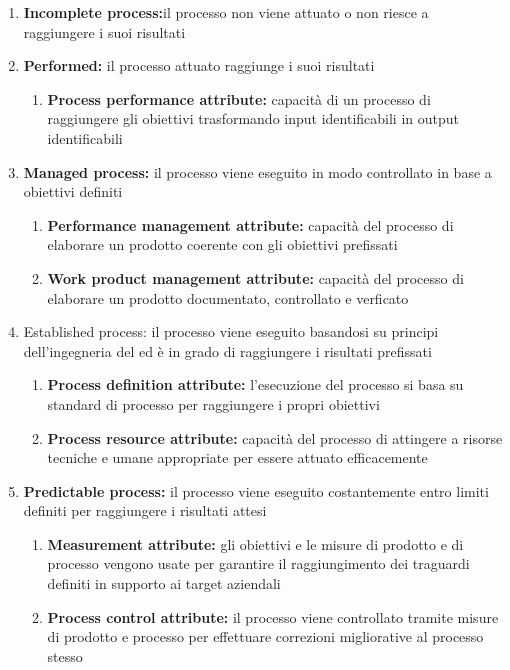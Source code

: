 \documentclass[12pt,a4paper]{article}
\begin{document}
\begin{enumerate}
	\item\textbf{Incomplete process:}il processo non viene attuato o non riesce a raggiungere i	suoi risultati
	
	\item\textbf{Performed:} il processo attuato raggiunge i suoi risultati
	\begin{enumerate}
		\item\textbf{Process performance attribute:} capacità di un processo di raggiungere gli obiettivi trasformando input identificabili in output identificabili
	\end{enumerate}
	
	\item \textbf{Managed process:} il processo viene eseguito in modo controllato in base a obiettivi definiti
	\begin{enumerate}
		\item\textbf{Performance management attribute:} capacità del processo di elaborare un prodotto coerente con gli obiettivi prefissati
		\item\textbf{ Work product management attribute:} capacità del processo di elaborare un prodotto documentato, controllato e verficato
	\end{enumerate}
	
	\item{Established process:} il processo viene eseguito basandosi su principi dell'ingegneria del   ed è in grado di raggiungere i risultati prefissati
	\begin{enumerate}
		\item\textbf {Process definition attribute: } l'esecuzione del processo si basa su standard di processo per raggiungere i propri obiettivi
		\item \textbf{Process resource attribute: }capacità del processo di attingere a risorse
		tecniche e umane appropriate per essere attuato efficacemente
	\end{enumerate}
	
	\item\textbf{Predictable process:} il processo viene eseguito costantemente entro limiti definiti
	per raggiungere i risultati attesi
	\begin{enumerate}
		\item \textbf{ Measurement attribute:} gli obiettivi e le misure di prodotto e di processo vengono usate per garantire il raggiungimento dei traguardi definiti in		supporto ai target aziendali
		\item\textbf{ Process control attribute:} il processo viene controllato tramite misure di prodotto e processo per effettuare correzioni migliorative al processo stesso
	\end{enumerate}
	

\end{enumerate}
\end{document}
